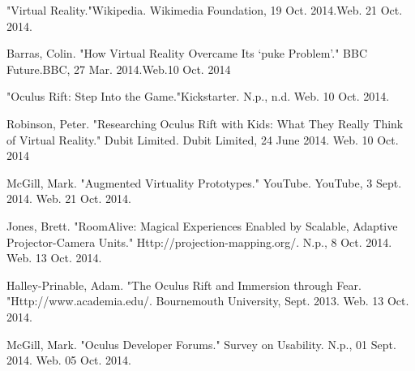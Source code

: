 \documentclass[a4paper]{article}
\begin{document}
\begin{thebibliography}{9}

"Virtual Reality."Wikipedia. Wikimedia Foundation, 19 Oct. 2014.Web. 21 Oct. 2014.

Barras, Colin.
"How Virtual Reality Overcame Its ‘puke Problem’." BBC Future.BBC, 27 Mar. 2014.Web.10 Oct. 2014

"Oculus Rift: Step Into the Game."Kickstarter. N.p., n.d. Web. 10 Oct. 2014.
  
Robinson, Peter. "Researching Oculus Rift with Kids: What They Really Think of Virtual Reality." Dubit Limited. Dubit Limited, 24 June 2014. Web. 10 Oct. 2014

 McGill, Mark. "Augmented Virtuality Prototypes." YouTube. YouTube, 3 Sept. 2014. Web. 21 Oct. 2014.
 
Jones, Brett. "RoomAlive: Magical Experiences Enabled by Scalable, Adaptive Projector-Camera Units." Http://projection-mapping.org/. N.p., 8 Oct. 2014. Web. 13 Oct. 2014.

Halley-Prinable, Adam. "The Oculus Rift and Immersion through Fear. "Http://www.academia.edu/. Bournemouth University, Sept. 2013. Web. 13 Oct. 2014.  
  
McGill, Mark. "Oculus Developer Forums." Survey on Usability. N.p., 01 Sept. 2014. Web. 05 Oct. 2014.  

\end{thebibliography}
\end{document}
